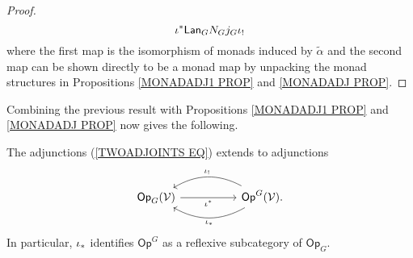 \documentclass[a4paper,10pt]{article}%
\begin{document}
\begin{proof}
\[	\iota^{\**} \mathsf{Lan}_G  N_G  j_G \iota_!
\]
where the first map is the isomorphism of monads induced by $\tilde{\alpha}$ and the second map can be shown directly to be a monad map by unpacking the monad structures in 
Propositions \ref{MONADADJ1 PROP} and \ref{MONADADJ PROP}.
\end{proof}


Combining the previous result with
Propositions \ref{MONADADJ1 PROP} and \ref{MONADADJ PROP} now gives the following.

\begin{corollary}
	The adjunctions (\ref{TWOADJOINTS EQ}) extends to  adjunctions
\begin{equation}\label{TWOADJOINTSOP EQ}
\begin{tikzcd}[column sep =5em]
	\mathsf{Op}_G(\mathcal{V}) \ar{r}[swap]{\iota^{\**}} 
	&
	\mathsf{Op}^G(\mathcal{V})
	\ar[bend right]{l}[swap,midway]{\iota_{!}}
	\ar[bend left]{l}{\iota_{\**}}.
\end{tikzcd}
\end{equation}
In particular, $\iota_{\**}$
identifies $\mathsf{Op}^G$ as a reflexive subcategory of 
$\mathsf{Op}_G$.
\end{corollary}
\end{document}
